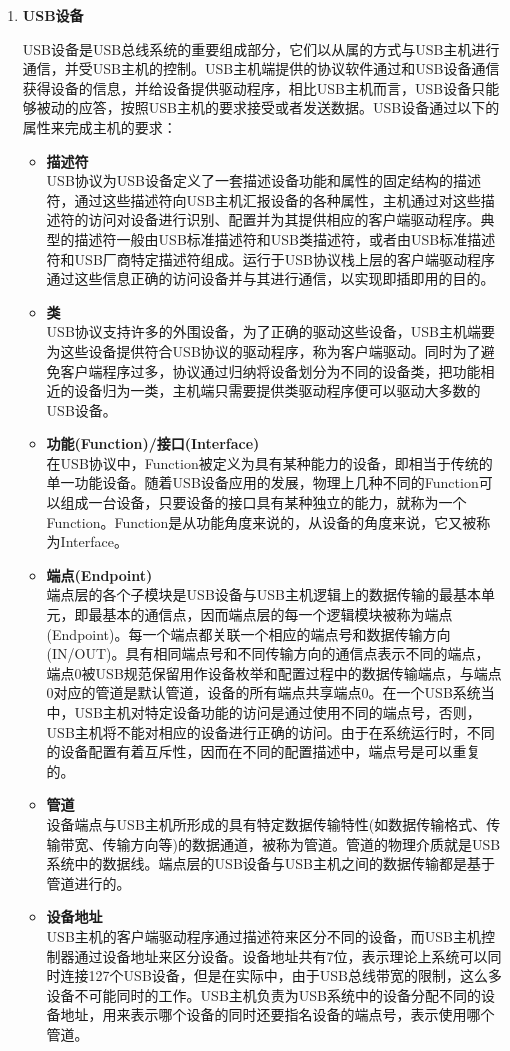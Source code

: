 \begin{enumerate}
\item \textbf{USB设备}

	USB设备是USB总线系统的重要组成部分，它们以从属的方式与USB主机进行通信，并受USB主机的控制。USB主机端提供的协议软件通过和USB设备通信获得设备的信息，并给设备提供驱动程序，相比USB主机而言，USB设备只能够被动的应答，按照USB主机的要求接受或者发送数据。USB设备通过以下的属性来完成主机的要求：
	\begin{itemize}
	\item \textbf{描述符}\\
	USB协议为USB设备定义了一套描述设备功能和属性的固定结构的描述符，通过这些描述符向USB主机汇报设备的各种属性，主机通过对这些描述符的访问对设备进行识别、配置并为其提供相应的客户端驱动程序。典型的描述符一般由USB标准描述符和USB类描述符，或者由USB标准描述符和USB厂商特定描述符组成。运行于USB协议栈上层的客户端驱动程序通过这些信息正确的访问设备并与其进行通信，以实现即插即用的目的。
	\item \textbf{类}\\
	USB协议支持许多的外围设备，为了正确的驱动这些设备，USB主机端要为这些设备提供符合USB协议的驱动程序，称为客户端驱动。同时为了避免客户端程序过多，协议通过归纳将设备划分为不同的设备类，把功能相近的设备归为一类，主机端只需要提供类驱动程序便可以驱动大多数的USB设备。	
	\item \textbf{功能(Function)/接口(Interface)}\\
	在USB协议中，Function被定义为具有某种能力的设备，即相当于传统的单一功能设备。随着USB设备应用的发展，物理上几种不同的Function可以组成一台设备，只要设备的接口具有某种独立的能力，就称为一个Function。Function是从功能角度来说的，从设备的角度来说，它又被称为Interface。
	\item \textbf{端点(Endpoint)}\\
	端点层的各个子模块是USB设备与USB主机逻辑上的数据传输的最基本单元，即最基本的通信点，因而端点层的每一个逻辑模块被称为端点(Endpoint)。每一个端点都关联一个相应的端点号和数据传输方向(IN/OUT)。具有相同端点号和不同传输方向的通信点表示不同的端点，端点0被USB规范保留用作设备枚举和配置过程中的数据传输端点，与端点0对应的管道是默认管道，设备的所有端点共享端点0。在一个USB系统当中，USB主机对特定设备功能的访问是通过使用不同的端点号，否则，USB主机将不能对相应的设备进行正确的访问。由于在系统运行时，不同的设备配置有着互斥性，因而在不同的配置描述中，端点号是可以重复的。
	\item \textbf{管道}\\
	设备端点与USB主机所形成的具有特定数据传输特性(如数据传输格式、传输带宽、传输方向等)的数据通道，被称为管道。管道的物理介质就是USB系统中的数据线。端点层的USB设备与USB主机之间的数据传输都是基于管道进行的。
	\item \textbf{设备地址}\\
	USB主机的客户端驱动程序通过描述符来区分不同的设备，而USB主机控制器通过设备地址来区分设备。设备地址共有7位，表示理论上系统可以同时连接127个USB设备，但是在实际中，由于USB总线带宽的限制，这么多设备不可能同时的工作。USB主机负责为USB系统中的设备分配不同的设备地址，用来表示哪个设备的同时还要指名设备的端点号，表示使用哪个管道。
	\end{itemize}	
	
\end{enumerate}

